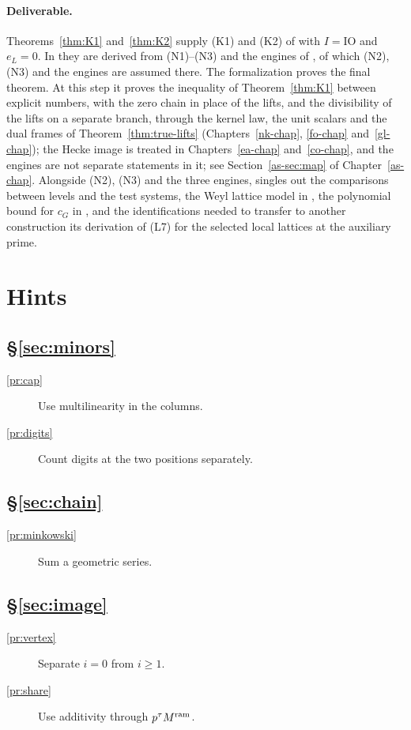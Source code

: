 \documentclass[reqno]{amsart}
\newcounter{chap}
\theoremstyle{definition}
\theoremstyle{plain}
\newcommand{\IO}{\mathrm{IO}}
\begin{document}
\paragraph{Deliverable.}
Theorems~\ref{thm:K1} and~\ref{thm:K2} supply (K1) and (K2) of \cite[Def.~18.9]{Adr} with \(I=\IO\) and \(e_L=0\).  In \cite{Adr} they are derived from (N1)--(N3) and the engines of \cite[Hyp.~12.12]{Adr}, of which (N2), (N3) and the engines are assumed there.  The formalization proves the final theorem.  At this step it proves the inequality of Theorem~\ref{thm:K1} between explicit numbers, with the zero chain in place of the lifts, and the divisibility of the lifts on a separate branch, through the kernel law, the unit scalars and the dual frames of Theorem~\ref{thm:true-lifts} (Chapters~\ref{nk-chap}, \ref{fo-chap} and~\ref{gl-chap}); the Hecke image is treated in Chapters~\ref{ea-chap} and~\ref{co-chap}, and the engines are not separate statements in it; see Section~\ref{as-sec:map} of Chapter~\ref{as-chap}.  Alongside (N2), (N3) and the three engines, \cite[\S18.7]{Adr} singles out the comparisons between levels and the test systems, the Weyl lattice model in \cite[Cor.~12.65]{Adr}, the polynomial bound for \(c_G\) in \cite[Prop.~12.67]{Adr}, and the identifications needed to transfer to another construction its derivation of (L7) for the selected local lattices at the auxiliary prime.

\section*{Hints}
\subsection*{\S\ref{sec:minors}}
\begin{description}
\item[\ref{pr:cap}] Use multilinearity in the columns.
\item[\ref{pr:digits}] Count digits at the two positions separately.
\end{description}
\subsection*{\S\ref{sec:chain}}
\begin{description}
\item[\ref{pr:minkowski}] Sum a geometric series.
\end{description}
\subsection*{\S\ref{sec:image}}
\begin{description}
\item[\ref{pr:vertex}] Separate \(i=0\) from \(i\ge1\).
\item[\ref{pr:share}] Use additivity through \(p^\tau M^{\rm ram}\).
\end{description}
\end{document}
